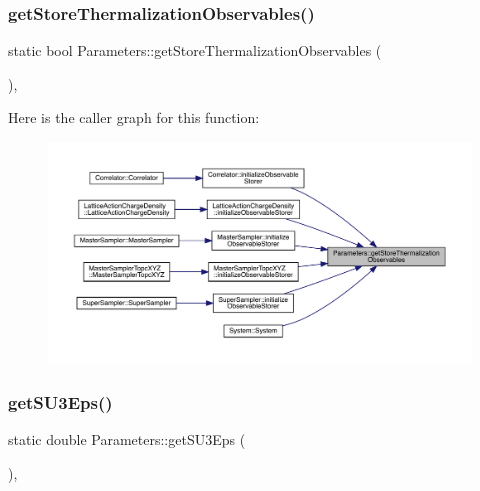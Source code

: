 \subsubsection{\texorpdfstring{getStoreThermalizationObservables()}{getStoreThermalizationObservables()}}
{\footnotesize\ttfamily static bool Parameters\+::get\+Store\+Thermalization\+Observables (\begin{DoxyParamCaption}{ }\end{DoxyParamCaption})\hspace{0.3cm}{\ttfamily [inline]}, {\ttfamily [static]}}

Here is the caller graph for this function\+:\nopagebreak
\begin{figure}[H]
\begin{center}
\leavevmode
\includegraphics[width=350pt]{class_parameters_a216f85b3c5980a33f8a54c42fb3575c7_icgraph}
\end{center}
\end{figure}
\mbox{\label{class_parameters_ac14d1b11099fdfa254fb138d4471ceb2}} 
\subsubsection{\texorpdfstring{getSU3Eps()}{getSU3Eps()}}
{\footnotesize\ttfamily static double Parameters\+::get\+S\+U3\+Eps (\begin{DoxyParamCaption}{ }\end{DoxyParamCaption})\hspace{0.3cm}{\ttfamily [inline]}, {\ttfamily [static]}}

